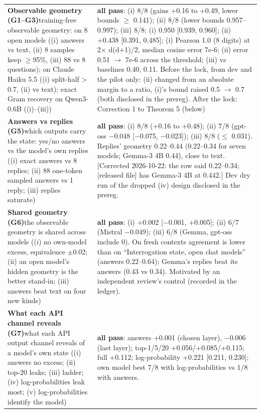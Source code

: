 {\begin{longtable}{p{}p{}}
\textbf{Observable geometry (G1--G3)}\newline training-free observable geometry: on 8 open models ((i) answers vs text, (ii) 8 samples keep $\geq$95\%, (iii) 88 vs 8 questions); on Claude Haiku 5.5 ((i) split-half > 0.7, (ii) vs text); exact Gram recovery on Qwen3-0.6B ((i)--(iii)) & \textbf{all pass}: (i) 8/8 (gains +0.16 to +0.49, lower bounds $\geq$ 0.141); (ii) 8/8 (lower bounds 0.957--0.997); (iii) 8/8; (i) 0.950 [0.939, 0.960]; (ii) +0.438 [0.391, 0.485]; (i) Pearson 1.0 (8 digits) at 2$\times$ d(d+1)/2, median cosine error 7e-6; (ii) error 0.51 $\rightarrow$ 7e-6 across the threshold; (iii) vs baselines 0.40, 0.11. Before the lock, from dev and the pilot only: (ii) changed from an absolute margin to a ratio, (i)'s bound raised 0.5 $\rightarrow$ 0.7 (both disclosed in the prereg). After the lock: Correction 1 to Theorem 5 (below)\\[2pt]
\textbf{Answers vs replies (G5)}\newline which outputs carry the state: yes/no answers vs the model's own replies ((i) exact answers vs 8 replies; (ii) 88 one-token sampled answers vs 1 reply; (iii) replies saturate) & \textbf{all pass}: (i) 8/8 (+0.16 to +0.48); (ii) 7/8 (gpt-oss $-$0.048 [$-$0.075, $-$0.023]); (iii) 8/8 ($\leq$ 0.031). Replies' geometry 0.22--0.44 (0.22--0.34 for seven models; Gemma-3 4B 0.44), close to text. [Corrected 2026-10-22: the row said 0.22--0.34; [released file] has Gemma-3 4B at 0.442.] Dev dry run of the dropped (iv) design disclosed in the prereg.\\[2pt]
\textbf{Shared geometry (G6)}\newline the observable geometry is shared across models ((i) no own-model excess, equivalence $\pm$0.02; (ii) an open model's hidden geometry is the better stand-in; (iii) answers beat text on four new kinds) & \textbf{all pass}: (i) +0.002 [$-$0.001, +0.005]; (ii) 6/7 (Mistral $-$0.049); (iii) 6/8 (Gemma, gpt-oss include 0). On fresh contexts agreement is lower than on ``Interrogation state, open chat models'' (answers 0.22--0.64); Gemma's replies beat its answers (0.43 vs 0.34). Motivated by an independent review's control (recorded in the ledger).\\[2pt]
\textbf{What each API channel reveals (G7)}\newline what each API output channel reveals of a model's own state ((i) answers no excess; (ii) top-20 leaks; (iii) ladder; (iv) log-probabilities leak most; (v) log-probabilities identify the model) & \textbf{all pass}: answers +0.001 (chosen layer), $-$0.006 (last layer); top-1/5/20 +0.056/+0.085/+0.115; full +0.112; log-probability +0.221 [0.211, 0.230]; own model best 7/8 with log-probabilities vs 1/8 with answers.\\[2pt]

\end{longtable}}
